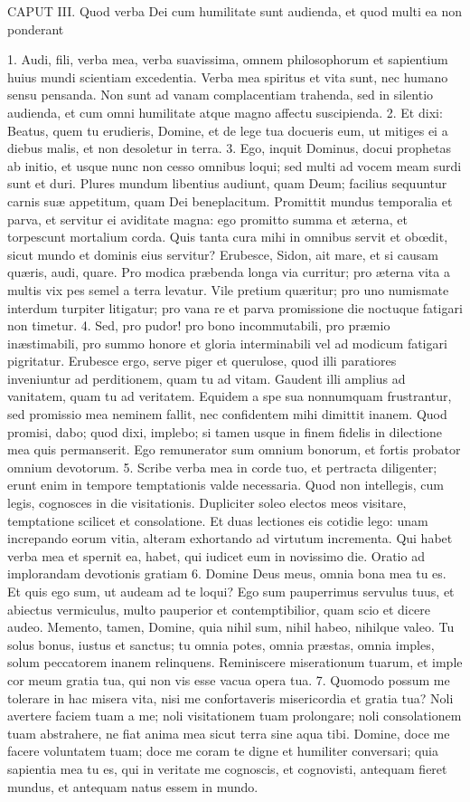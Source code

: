 CAPUT III.
Quod verba Dei cum humilitate sunt audienda, et quod multi ea non ponderant

1. Audi, fili, verba mea, verba suavissima, omnem philosophorum et sapientium huius mundi scientiam excedentia. Verba mea spiritus et vita sunt, nec humano sensu pensanda. Non sunt ad vanam complacentiam trahenda, sed in silentio audienda, et cum omni humilitate atque magno affectu suscipienda.
2. Et dixi: Beatus, quem tu erudieris, Domine, et de lege tua docueris eum, ut mitiges ei a diebus malis, et non desoletur in terra.
3. Ego, inquit Dominus, docui prophetas ab initio, et usque nunc non cesso omnibus loqui; sed multi ad vocem meam surdi sunt et duri. Plures mundum libentius audiunt, quam Deum; facilius sequuntur carnis suæ appetitum, quam Dei beneplacitum. Promittit mundus temporalia et parva, et servitur ei aviditate magna: ego promitto summa et æterna, et torpescunt mortalium corda. Quis tanta cura mihi in omnibus servit et obœdit, sicut mundo et dominis eius servitur? Erubesce, Sidon, ait mare, et si causam quæris, audi, quare. Pro modica præbenda longa via curritur; pro æterna vita a multis vix pes semel a terra levatur. Vile pretium quæritur; pro uno numismate interdum turpiter litigatur; pro vana re et parva promissione die noctuque fatigari non timetur.
4. Sed, pro pudor! pro bono incommutabili, pro præmio inæstimabili, pro summo honore et gloria interminabili vel ad modicum fatigari pigritatur. Erubesce ergo, serve piger et querulose, quod illi paratiores inveniuntur ad perditionem, quam tu ad vitam. Gaudent illi amplius ad vanitatem, quam tu ad veritatem. Equidem a spe sua nonnumquam frustrantur, sed promissio mea neminem fallit, nec confidentem mihi dimittit inanem. Quod promisi, dabo; quod dixi, implebo; si tamen usque in finem fidelis in dilectione mea quis permanserit. Ego remunerator sum omnium bonorum, et fortis probator omnium devotorum.
5. Scribe verba mea in corde tuo, et pertracta diligenter; erunt enim in tempore temptationis valde necessaria. Quod non intellegis, cum legis, cognosces in die visitationis. Dupliciter soleo electos meos visitare, temptatione scilicet et consolatione. Et duas lectiones eis cotidie lego: unam increpando eorum vitia, alteram exhortando ad virtutum incrementa. Qui habet verba mea et spernit ea, habet, qui iudicet eum in novissimo die.
Oratio ad implorandam devotionis gratiam
6. Domine Deus meus, omnia bona mea tu es. Et quis ego sum, ut audeam ad te loqui? Ego sum pauperrimus servulus tuus, et abiectus vermiculus, multo pauperior et contemptibilior, quam scio et dicere audeo. Memento, tamen, Domine, quia nihil sum, nihil habeo, nihilque valeo. Tu solus bonus, iustus et sanctus; tu omnia potes, omnia præstas, omnia imples, solum peccatorem inanem relinquens. Reminiscere miserationum tuarum, et imple cor meum gratia tua, qui non vis esse vacua opera tua.
7. Quomodo possum me tolerare in hac misera vita, nisi me confortaveris misericordia et gratia tua? Noli avertere faciem tuam a me; noli visitationem tuam prolongare; noli consolationem tuam abstrahere, ne fiat anima mea sicut terra sine aqua tibi. Domine, doce me facere voluntatem tuam; doce me coram te digne et humiliter conversari; quia sapientia mea tu es, qui in veritate me cognoscis, et cognovisti, antequam fieret mundus, et antequam natus essem in mundo.


